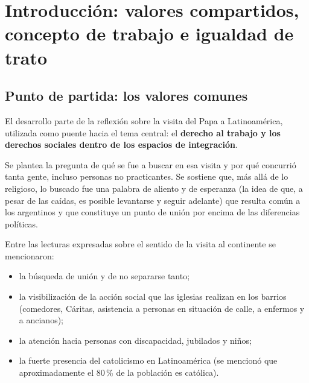 \documentclass[12pt,oneside]{book}
\begin{document}
\tableofcontents

\chapter[Valores, trabajo e igualdad]{Introducción: valores compartidos, concepto de trabajo e igualdad de trato}


\section{Punto de partida: los valores comunes}

El desarrollo parte de la reflexión sobre la visita del Papa a Latinoamérica, utilizada como puente hacia el tema central: el \textbf{derecho al trabajo y los derechos sociales dentro de los espacios de integración}.

Se plantea la pregunta de qué se fue a buscar en esa visita y por qué concurrió tanta gente, incluso personas no practicantes. Se sostiene que, más allá de lo religioso, lo buscado fue una palabra de aliento y de esperanza (la idea de que, a pesar de las caídas, es posible levantarse y seguir adelante) que resulta común a los argentinos y que constituye un punto de unión por encima de las diferencias políticas.

Entre las lecturas expresadas sobre el sentido de la visita al continente se mencionaron:
\begin{itemize}
    \item la búsqueda de unión y de no separarse tanto;
    \item la visibilización de la acción social que las iglesias realizan en los barrios (comedores, Cáritas, asistencia a personas en situación de calle, a enfermos y a ancianos);
    \item la atención hacia personas con discapacidad, jubilados y niños;
    \item la fuerte presencia del catolicismo en Latinoamérica (se mencionó que aproximadamente el 80\,\% de la población es católica).
\end{itemize}
\end{document}
